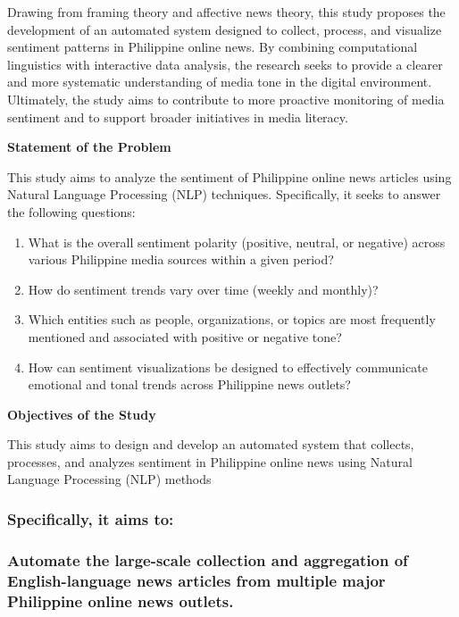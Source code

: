 Drawing from framing theory and affective news theory, this study proposes the development of an automated system designed to collect, process, and visualize sentiment patterns in Philippine online news. By combining computational linguistics with interactive data analysis, the research seeks to provide a clearer and more systematic understanding of media tone in the digital environment. Ultimately, the study aims to contribute to more proactive monitoring of media sentiment and to support broader initiatives in media literacy.

\textbf{Statement of the Problem}

This study aims to analyze the sentiment of Philippine online news articles using Natural Language Processing (NLP) techniques. Specifically, it seeks to answer the following questions:

\begin{enumerate}
\def\labelenumi{\arabic{enumi}.}
\item
  What is the overall sentiment polarity (positive, neutral, or negative) across various Philippine media sources within a given period?
\item
  How do sentiment trends vary over time (weekly and monthly)?
\item
  Which entities such as people, organizations, or topics are most frequently mentioned and associated with positive or negative tone?
\item
  How can sentiment visualizations be designed to effectively communicate emotional and tonal trends across Philippine news outlets?
\end{enumerate}

\textbf{Objectives of the Study}

This study aims to design and develop an automated system that collects, processes, and analyzes sentiment in Philippine online news using Natural Language Processing (NLP) methods

\subsubsection{\texorpdfstring{\textbf{Specifically, it aims to:}}{Specifically, it aims to:}}\label{specifically-it-aims-to}

\subsubsection{Automate the large-scale collection and aggregation of English-language news articles from multiple major Philippine online news outlets.}\label{automate-the-large-scale-collection-and-aggregation-of-english-language-news-articles-from-multiple-major-philippine-online-news-outlets.}


